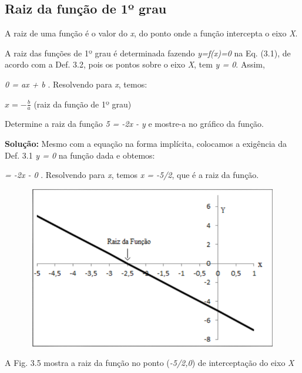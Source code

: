 \subsection{Raiz da função de 1º grau}

\begin{caixa}
\begin{tdefinicao}
	A raiz de uma função é o valor do \textit{x}, do ponto onde a função intercepta o eixo \textit{X}.
\end{tdefinicao}
\end{caixa}

A raiz das funções de 1º grau é determinada fazendo \textit{y=f(x)=0} na Eq. (3.1), de acordo com a Def. 3.2, pois os pontos sobre o eixo \textit{X}, tem \textit{y = 0}. Assim, 

\textit{0 = ax + b} . Resolvendo para \textit{x}, temos:

\begin{caixa}
 \( x=-\frac{b}{a} \) \tab (raiz da função de 1º grau)
\end{caixa}

\begin{texemplo}
Determine a raiz da função  \textit{5 = -2x - y}  e mostre-a no gráfico da função.

\textbf{Solução:} Mesmo com a equação na forma implícita, colocamos a exigência da Def. 3.1 \textit{y = 0}  na função dada e obtemos: 

\textit{ = -2x - 0} .  Resolvendo para \textit{x}, temos   \textit{x = -5/2}, que é a raiz da função. 

\begin{figure}[H]
	\begin{Center}
		\includegraphics[width=4.41in,height=2.79in]{capitulos/funcao_do_primeiro_grau/media/image12.pdf}
	\end{Center}
\end{figure}

A Fig. 3.5 mostra a raiz da função no ponto (\textit{-5/2,0}) de interceptação do eixo \textit{X}  \qedsymbol{}
\end{texemplo}

